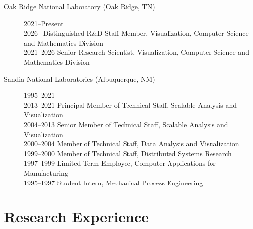 \documentclass{article}
\begin{document}
\begin{description}
\item[Oak Ridge National Laboratory (Oak Ridge, TN)]\hfill 2021--Present\\
  2026-- Distinguished R\&D Staff Member, Visualization, Computer Science and Mathematics Division\\
  2021--2026 Senior Research Scientist, Visualization, Computer Science and Mathematics Division

\item[Sandia National Laboratories (Albuquerque, NM)]\hfill 1995--2021\\
  2013--2021 Principal Member of Technical Staff, Scalable Analysis and Visualization\\
  2004--2013 Senior Member of Technical Staff, Scalable Analysis and Visualization\\
  2000--2004 Member of Technical Staff, Data Analysis and Visualization\\
  1999--2000 Member of Technical Staff, Distributed Systems Research\\
  1997--1999 Limited Term Employee, Computer Applications for Manufacturing\\
  1995--1997 Student Intern, Mechanical Process Engineering
\end{description}


\section*{Research Experience}
\end{document}
